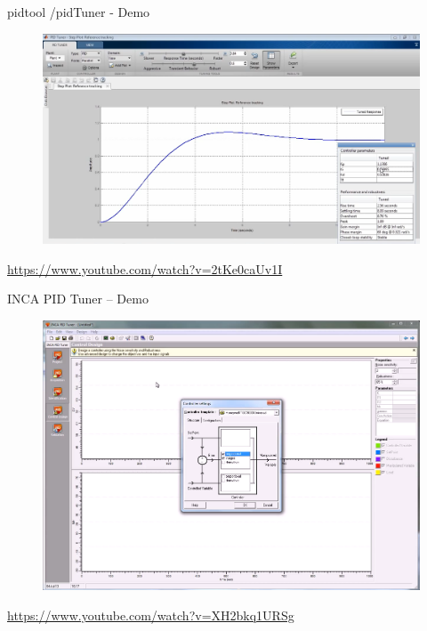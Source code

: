 \begin{frame}{pidtool /pidTuner - Demo}
	\begin{figure}
\centering
\includegraphics[width=0.7\linewidth]{img/pid_tool}

\end{figure}
\url{https://www.youtube.com/watch?v=2tKe0caUv1I}
\end{frame}
\begin{frame}{INCA PID Tuner – Demo}
	\begin{figure}
\centering
\includegraphics[width=0.7\linewidth]{img/inca_tunner}
\end{figure}
\url{https://www.youtube.com/watch?v=XH2bkq1URSg}
\end{frame}